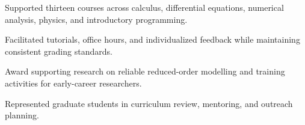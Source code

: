 \documentclass[fontsize=11pt, margin=normal, medium=print]{careerdossier-cv}
\begin{document}
\begin{CDossierEntry}[title = {Teaching Assistant}, organization = {Department of Mathematics and Statistics}, location = {Example University}, dates = {2016--2021}]
  \begin{CDossierItemize}
    \item Supported thirteen courses across calculus, differential equations, numerical analysis, physics, and introductory programming.
    \item Facilitated tutorials, office hours, and individualized feedback while maintaining consistent grading standards.
  \end{CDossierItemize}
\end{CDossierEntry}
\begin{CDossierEntry}[title = {Postdoctoral Research Fellowship}, organization = {Example Research Council}, location = {Canada}, dates = {2024--2026}]
  Award supporting research on reliable reduced-order modelling and training activities for early-career researchers.
\end{CDossierEntry}
\begin{CDossierEntry}[title = {Graduate Student Representative}, organization = {Departmental Curriculum Committee}, location = {Example University}, dates = {2019--2021}]
  Represented graduate students in curriculum review, mentoring, and outreach planning.
\end{CDossierEntry}
\end{document}
